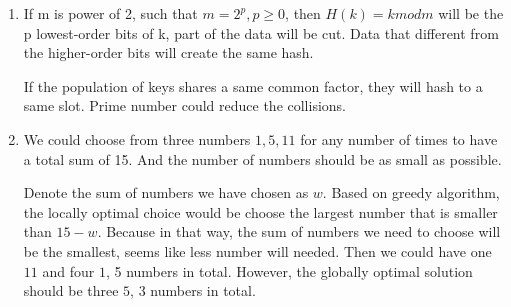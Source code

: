 \documentclass{assignment}
\begin{document}
\begin{homeworkProblem}
\begin{enumerate}
\item If m is power of 2, such that $m=2^p, p\geq 0$, then $H(k) = k mod m$ will be the p lowest-order bits of k, part of the data will be cut. Data that different from the higher-order bits will create the same hash. 

If the population of keys shares a same common factor, they will hash to a same slot. Prime number could reduce  the collisions.
\item We could choose from three numbers $1, 5, 11$ for any number of times to have a total sum of 15. And the number of numbers should be as small as possible.

Denote the sum of numbers we have chosen as $w$. 
Based on greedy algorithm, the locally optimal choice would be choose the largest number that is smaller than $15-w$. Because in that way, the sum of numbers we need to choose will be the smallest, seems like less number will needed. Then we could have one $11$ and four $1$, 5 numbers in total. However, the globally optimal solution should be three $5$, 3 numbers in total.

    
    \end{enumerate}
    
    \end{homeworkProblem}
    
\end{document}
